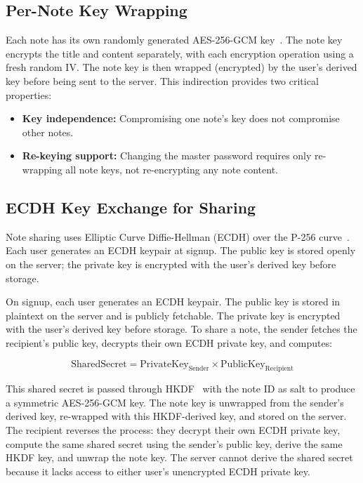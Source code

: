 \documentclass[conference]{IEEEtran}
\begin{document}
\subsection{Per-Note Key Wrapping}

Each note has its own randomly generated AES-256-GCM key~\cite{ref2,ref17}. The note key encrypts the title and content separately, with each encryption operation using a fresh random IV. The note key is then wrapped (encrypted) by the user's derived key before being sent to the server. This indirection provides two critical properties:
\begin{itemize}
    \item \textbf{Key independence:} Compromising one note's key does not compromise other notes.
    \item \textbf{Re-keying support:} Changing the master password requires only re-wrapping all note keys, not re-encrypting any note content.
\end{itemize}

\subsection{ECDH Key Exchange for Sharing}

Note sharing uses Elliptic Curve Diffie-Hellman (ECDH) over the P-256 curve~\cite{ref7,ref9}. Each user generates an ECDH keypair at signup. The public key is stored openly on the server; the private key is encrypted with the user's derived key before storage.

On signup, each user generates an ECDH keypair. The public key is stored in plaintext on the server and is publicly fetchable. The private key is encrypted with the user's derived key before storage. To share a note, the sender fetches the recipient's public key, decrypts their own ECDH private key, and computes:

\[
\text{SharedSecret} = \text{PrivateKey}_{\text{Sender}} \times \text{PublicKey}_{\text{Recipient}}
\]

This shared secret is passed through HKDF~\cite{ref4,ref8} with the note ID as salt to produce a symmetric AES-256-GCM key. The note key is unwrapped from the sender's derived key, re-wrapped with this HKDF-derived key, and stored on the server. The recipient reverses the process: they decrypt their own ECDH private key, compute the same shared secret using the sender's public key, derive the same HKDF key, and unwrap the note key. The server cannot derive the shared secret because it lacks access to either user's unencrypted ECDH private key.
\end{document}
